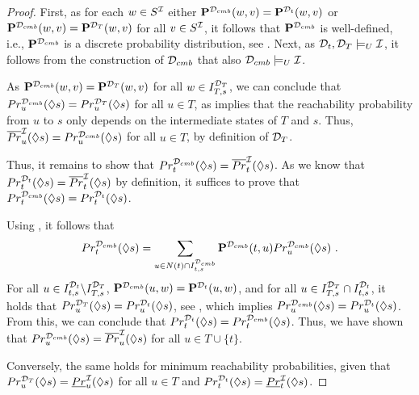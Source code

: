 \begin{proof}
    First, as for each $w\in S^{\mathcal{I}}$ either $\mathbf{P}^{\mathcal{D}_{cmb}}(w,v) = \mathbf{P}^{\mathcal{D}_{t}}(w,v)$ or $\mathbf{P}^{\mathcal{D}_{cmb}}(w,v) = \mathbf{P}^{\mathcal{D}_{T}}(w,v)$ for all $v\in S^{\mathcal{I}}$, it follows that $\mathbf{P}^{\mathcal{D}_{cmb}}$ is well-defined, i.e., $\mathbf{P}^{\mathcal{D}_{cmb}}$ is a discrete probability distribution, see . Next, as $\mathcal{D}_t,\mathcal{D}_T \models_U \mathcal{I}$, it follows from the construction of $\mathcal{D}_{cmb}$ that also $\mathcal{D}_{cmb} \models_U \mathcal{I}$.
    
    As $\mathbf{P}^{\mathcal{D}_{cmb}}(w,v) = \mathbf{P}^{\mathcal{D}_{T}}(w,v)$ for all $w \in I^{\mathcal{D}_T}_{T,s}$, we can conclude that $Pr^{\mathcal{D}_{cmb}}_u(\lozenge s) = Pr^{\mathcal{D}_{T}}_u(\lozenge s)$ for all $u\in T$, as  implies that the reachability probability from $u$ to $s$ only depends on the intermediate states of $T$ and $s$. Thus, $\overline{Pr}^{\mathcal{I}}_{u}(\lozenge s) = Pr^{\mathcal{D}_{cmb}}_u(\lozenge s)$ for all $u\in T$, by definition of $\mathcal{D}_{T}$.

    Thus, it remains to show that $Pr^{\mathcal{D}_{cmb}}_t(\lozenge s) = \overline{Pr}^{\mathcal{I}}_{t}(\lozenge s)$. As we know that $Pr^{\mathcal{D}_{t}}_t(\lozenge s) = \overline{Pr}^{\mathcal{I}}_{t}(\lozenge s)$ by definition, it suffices to prove that $Pr^{\mathcal{D}_{cmb}}_t(\lozenge s) = Pr^{\mathcal{D}_{t}}_t(\lozenge s)$.

    Using , it follows that 
    \[Pr^{\mathcal{D}_{cmb}}_{t}(\lozenge s) = \sum_{u\in N(t)\cap I^{\mathcal{D}_{cmb}}_{t,s}}\mathbf{P}^{\mathcal{D}_{cmb}}(t,u) Pr_u^{\mathcal{D}_{cmb}}(\lozenge s)\ .\]
    For all $u\in I^{\mathcal{D}_t}_{t,s}\backslash I^{\mathcal{D}_T}_{T,s}$, $\mathbf{P}^{\mathcal{D}_{cmb}}(u,w) = \mathbf{P}^{\mathcal{D}_{t}}(u,w)$, and for all $u\in I^{\mathcal{D}_T}_{T,s} \cap I^{\mathcal{D}_t}_{t,s}$, it holds that $Pr^{\mathcal{D}_{T}}_u(\lozenge s) = Pr^{\mathcal{D}_t}_u(\lozenge s)$, see , which implies $Pr^{\mathcal{D}_{cmb}}_u(\lozenge s) = Pr^{\mathcal{D}_t}_u(\lozenge s)$. From this, we can conclude that $Pr^{\mathcal{D}_{t}}_{t}(\lozenge s) = Pr^{\mathcal{D}_{cmb}}_{t}(\lozenge s)$.
    Thus, we have shown that $Pr_u^{\mathcal{D}_{cmb}}(\lozenge s) = \overline{Pr}_u^{\mathcal{I}}(\lozenge s)$ for all $u\in T \cup \{t\}$.

    Conversely, the same holds for minimum reachability probabilities, given that $Pr_u^{\mathcal{D}_T}(\lozenge s) = \underline{Pr}_u^{\mathcal{I}}(\lozenge s)$ for all $u\in T$ and $Pr_t^{\mathcal{D}_t}(\lozenge s) = \underline{Pr}_t^{\mathcal{I}}(\lozenge s)$.
\end{proof}

